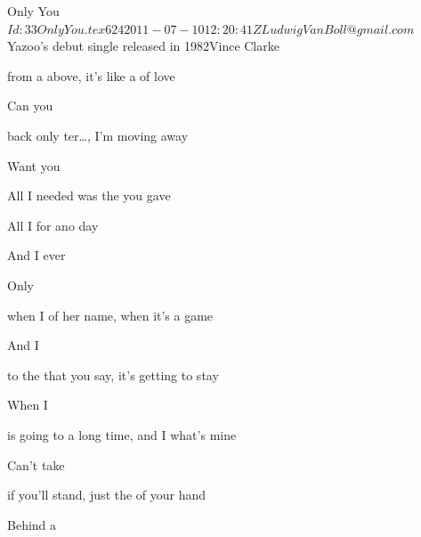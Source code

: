 \begin{SBSong}{Only You}
  {$Id: 33OnlyYou.tex 624 2011-07-10 12:20:41Z LudwigVanBoll@gmail.com $}
  {Yazoo's debut single released in 1982}{Vince Clarke}
  \mediumchords
  \smallchords
  \begin{SBVerse}
     from a  above,
       it's like a  of love 
    
    Can you  

     back only ter\ldots{},
      I'm moving  away 

    Want you  
  \end{SBVerse}
  \begin{SBChorus}
  
     All I needed was the  you gave

    All I  for ano day

    And  I ever  \SBDirection{$\downarrow\downarrow\downarrow\downarrow$} 

    Only        
  \end{SBChorus}
  \begin{SBVerse}
     when I  of her name,
       when it's  a game 

    And I  

     to the  that you say,
       it's getting  to stay  

    When I  
  \end{SBVerse}
  \begin{SBVerse}
     is going to  a long time,
       and I  what's mine 

    Can't take  

     if you'll stand,
       just the  of your hand 

    Behind a  
  \end{SBVerse}
\end{SBSong}
